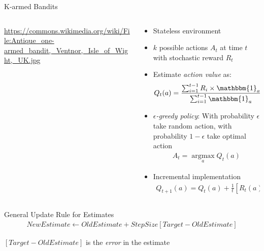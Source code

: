 \documentclass[ignorenonframetext,xcolor=x11names]{beamer}
\begin{document}
\begin{frame}{K-armed Bandits}
\begin{columns}
\begin{column}{.2\textwidth}
\tiny \url{https://commons.wikimedia.org/wiki/File:Antique_one-armed_bandit,_Ventnor,_Isle_of_Wight,_UK.jpg}
\end{column}
\begin{column}{.8\textwidth}
\small
\begin{itemize} 
   \item Stateless environment
   \item $k$ possible actions $A_t$ at time $t$ with stochastic reward $R_t$
   \item Estimate \emph{action value} as:
   \begin{align*}
   Q_t(a) = \frac{\sum_{i=1}^{t-1} R_i \times \mathbbm{1}_a}{\sum_{i=1}^{t-1} \mathbbm{1}_a} \qquad \text{(average reward)}
   \end{align*} \vspace{-.5\baselineskip}
   \item $\epsilon$\emph{-greedy policy}: With probability $\epsilon$ take random action, with probability $1-\epsilon$ take optimal action
   \begin{align*}
   A_t = \operatorname*{arg max}_a Q_t(a)
   \end{align*} \vspace{-\baselineskip}
   \item Incremental implementation
   \begin{align*}
   Q_{t+1}(a) = Q_t(a) + \frac{1}{t}\left[R_t(a) - Q_t(a)\right]
   \end{align*}
\end{itemize}
\end{column}
\end{columns}
\end{frame}

\begin{frame}{General Update Rule for Estimates}
\begin{align*}
NewEstimate \leftarrow OldEstimate + StepSize \left[ Target - OldEstimate \right]
\end{align*}

\vspace{\baselineskip}
$\left[ Target - OldEstimate \right]$ is the \emph{error} in the estimate
\end{frame}
\end{document}
